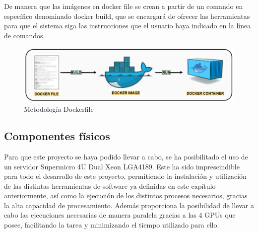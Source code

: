 De manera que las imágenes en docker file se crean a partir de un comando en específico denominado docker build, que se encargará de ofrecer las herramientas para que el sistema siga las instrucciones que el usuario haya indicado en la línea de comandos.

\begin{figure}[h]
    \centering
    \includegraphics[width=.75\textwidth]{images/Docker2.png}
    \caption{Metodología Dockerfile}
    \label{fig:img3}
\end{figure}



\subsection{Componentes físicos}
Para que este proyecto se haya podido llevar a cabo, se ha posibilitado el uso de un servidor Supermicro 4U Dual Xeon LGA4189. Este ha sido imprescindible para todo el desarrollo de este proyecto, permitiendo la instalación y utilización de las distintas herramientas de software ya definidas en este capítulo anteriormente, así como la ejecución de los distintos procesos necesarios, gracias la alta capacidad de procesamiento. Además proporciona la posibilidad de llevar a cabo las ejecuciones necesarias de manera paralela gracias a las 4 GPUs que posee, facilitando la tarea y minimizando el tiempo utilizado para ello.


\vspace{1cm}
